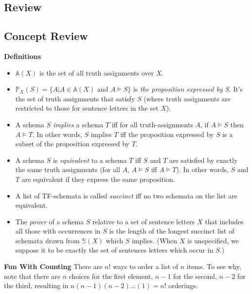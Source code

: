 \subsection{Review}
\begin{mdframed}[linewidth=1]
\section*{Concept Review}
\textbf{Definitions}
\begin{itemize}
    \item $\mathbb{A}(X)$ is the set of all truth assignments over $X$. 
    
    \item $\mathbb{P}_X(S) = \{A | A \in \mathbb{A}(X) \text{ and } A \models S\}$ is \emph{the proposition expressed by S}. It's the set of truth assignments that satisfy $S$ (where truth assignments are restricted to those for sentence letters in the set $X$). 
    
    \item A schema $S$ \emph{implies} a schema $T$ iff for all truth-assignments $A$, if $A \models S$ then $A \models T$. In other words, $S$ implies $T$ iff the proposition expressed by $S$ is a subset of the proposition expressed by $T$. 
    
    \item A schema $S$ is \emph{equivalent} to a schema $T$ iff $S$ and $T$ are satisfied by exactly the same truth assignments (for all $A$, $A \models S$ iff $A \models T$). In other words, $S$ and $T$ are equivalent if they express the same proposition. 

    \item A list of TF-schemata is called \emph{succinct} iff no two schemata on the list are equivalent. 
    
    \item The \emph{power} of a schema $S$ relative to a set of sentence letters $X$ that includes all those with occurrences in $S$ is the length of the longest succinct list of schemata drawn from $\mathbb{S}(X)$ which $S$ implies. (When $X$ is unspecified, we suppose it to be exactly the set of sentences letters which occur in $S$.) %
\end{itemize}

\textbf{Fun With Counting}
There are $n!$ ways to order a list of $n$ items. To see why, note that there are $n$ choices for the first element, $n - 1$ for the second, $n - 2$ for the third, resulting in $n(n - 1)(n - 2)...(1) = n!$ orderings. 


\end{mdframed}
